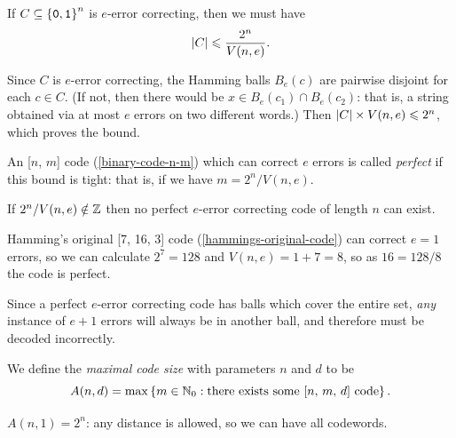 \documentclass{article}
\begin{document}
\begin{proposition}
    If $C \subseteq \left\lbrace \texttt{0}, \texttt{1} \right\rbrace^n$ is $e$-error correcting, then we must have
    \[
	\left\lvert C \right\rvert \leqslant \frac{2^n}{V(n, e)}.
	\]
\end{proposition}
\begin{prf}
    Since $C$ is $e$-error correcting,
    the Hamming balls $B_e(c)$ are pairwise disjoint for each $c \in C$.
    (If not, then there would be $x \in B_e(c_1) \cap B_e(c_2)$:
    that is, a string obtained via at most $e$ errors on two different words.)
    Then $\left\lvert C \right\rvert \times V(n, e) \leqslant 2^n$, which proves the bound.
\end{prf}

\begin{note}
	An [$n$, $m$] code (\ref{binary-code-n-m})
	which can correct $e$ errors
	is called \textit{perfect}
	if this bound is tight:
	that is, if we have $m = 2^n/V(n, e)$.
\end{note}

\begin{corollary}
    If $2^n/V(n, e) \notin \mathbb{Z}$
    then no perfect $e$-error correcting code of length $n$ can exist.
\end{corollary}

\begin{corollary}
    Hamming's original [7, 16, 3] code (\ref{hammings-original-code})
    can correct $e=1$ errors,
    so we can calculate $2^7 = 128$
    and $V(n, e) = 1 + 7 = 8$,
    so as $16 = 128/8$ the code is perfect.
\end{corollary}

\begin{corollary}
    Since a perfect $e$-error correcting code has balls which cover the entire set,
    \textit{any} instance of $e+1$ errors will always be in another ball,
    and therefore must be decoded incorrectly.
\end{corollary}

\begin{definition}
	\label{maximal-code-size}
    We define the \textit{maximal code size}
    with parameters $n$ and $d$ to be
    \[
	A(n, d) = \max
	\left\lbrace m \in \mathbb{N}_0 : \text{there exists some [$n$, $m$, $d$] code} \right\rbrace.
	\]
\end{definition}

\begin{corollary}
    $A(n, 1) = 2^n$: any distance is allowed,
    so we can have all codewords.
\end{corollary}
\end{document}
